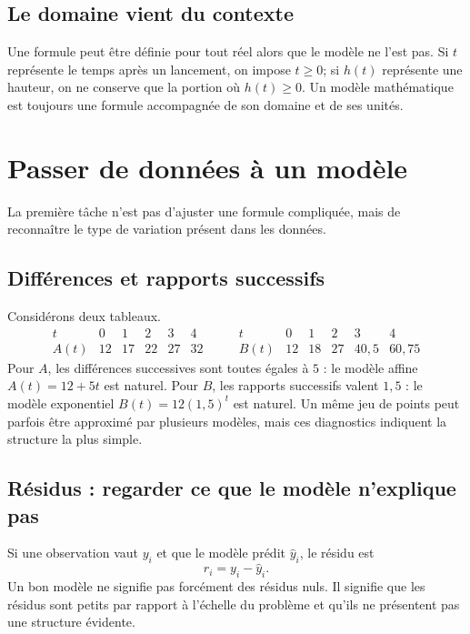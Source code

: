\documentclass[12pt,a4paper,openany]{book}
\begin{document}
\subsection{Le domaine vient du contexte}
Une formule peut être définie pour tout réel alors que le modèle ne l'est pas. Si $t$ représente le temps après un lancement, on impose $t\ge0$; si $h(t)$ représente une hauteur, on ne conserve que la portion où $h(t)\ge0$. Un modèle mathématique est toujours une formule accompagnée de son domaine et de ses unités.


\section{Passer de données à un modèle}

La première tâche n'est pas d'ajuster une formule compliquée, mais de reconnaître le type de variation présent dans les données.

\subsection{Différences et rapports successifs}
Considérons deux tableaux.
\[
\begin{array}{c|ccccc}
t&0&1&2&3&4\\\hline
A(t)&12&17&22&27&32
\end{array}
\qquad
\begin{array}{c|ccccc}
t&0&1&2&3&4\\\hline
B(t)&12&18&27&40{,}5&60{,}75
\end{array}
\]
Pour $A$, les différences successives sont toutes égales à $5$ : le modèle affine $A(t)=12+5t$ est naturel. Pour $B$, les rapports successifs valent $1{,}5$ : le modèle exponentiel $B(t)=12(1{,}5)^t$ est naturel. Un même jeu de points peut parfois être approximé par plusieurs modèles, mais ces diagnostics indiquent la structure la plus simple.

\subsection{Résidus : regarder ce que le modèle n'explique pas}
Si une observation vaut $y_i$ et que le modèle prédit $\widehat y_i$, le résidu est
\[
r_i=y_i-\widehat y_i.
\]
Un bon modèle ne signifie pas forcément des résidus nuls. Il signifie que les résidus sont petits par rapport à l'échelle du problème et qu'ils ne présentent pas une structure évidente.

\begin{center}
\end{center}
\end{document}
